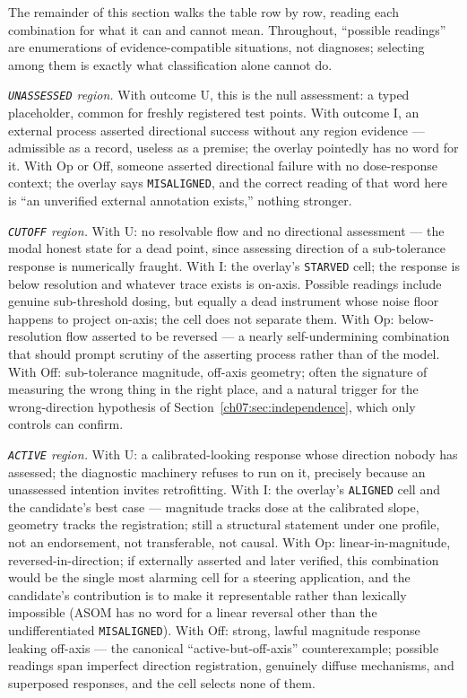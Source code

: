 The remainder of this section walks the table row by row, reading each
combination for what it can and cannot mean. Throughout, ``possible
readings'' are enumerations of evidence-compatible situations, not
diagnoses; selecting among them is exactly what classification alone cannot
do.

\emph{\texttt{UNASSESSED} region.} With outcome U, this is the null
assessment: a typed placeholder, common for freshly registered test points.
With outcome I, an external process asserted directional success without any
region evidence --- admissible as a record, useless as a premise; the
overlay pointedly has no word for it. With Op or Off, someone asserted
directional failure with no dose-response context; the overlay says
\texttt{MISALIGNED}, and the correct reading of that word here is ``an
unverified external annotation exists,'' nothing stronger.

\emph{\texttt{CUTOFF} region.} With U: no resolvable flow and no
directional assessment --- the modal honest state for a dead point, since
assessing direction of a sub-tolerance response is numerically fraught.
With I: the overlay's \texttt{STARVED} cell; the response is below
resolution and whatever trace exists is on-axis. Possible readings include
genuine sub-threshold dosing, but equally a dead instrument whose noise
floor happens to project on-axis; the cell does not separate them. With Op:
below-resolution flow asserted to be reversed --- a nearly self-undermining
combination that should prompt scrutiny of the asserting process rather than
of the model. With Off: sub-tolerance magnitude, off-axis geometry; often
the signature of measuring the wrong thing in the right place, and a natural
trigger for the wrong-direction hypothesis of
Section~\ref{ch07:sec:independence}, which only controls can confirm.

\emph{\texttt{ACTIVE} region.} With U: a calibrated-looking response whose
direction nobody has assessed; the diagnostic machinery refuses to run on
it, precisely because an unassessed intention invites retrofitting. With I:
the overlay's \texttt{ALIGNED} cell and the candidate's best case ---
magnitude tracks dose at the calibrated slope, geometry tracks the
registration; still a structural statement under one profile, not an
endorsement, not transferable, not causal. With Op: linear-in-magnitude,
reversed-in-direction; if externally asserted and later verified, this
combination would be the single most alarming cell for a steering
application, and the candidate's contribution is to make it representable
rather than lexically impossible (ASOM has no word for a linear reversal
other than the undifferentiated \texttt{MISALIGNED}). With Off: strong,
lawful magnitude response leaking off-axis --- the canonical
``active-but-off-axis'' counterexample; possible readings span imperfect
direction registration, genuinely diffuse mechanisms, and superposed
responses, and the cell selects none of them.

